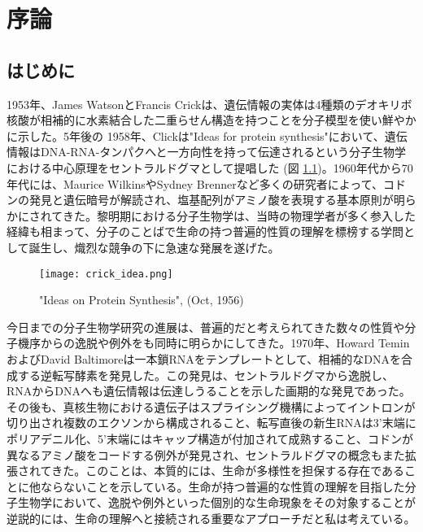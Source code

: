 \chapter{序論}

\section{はじめに}
1953年、James WatsonとFrancis Crickは、遺伝情報の実体は4種類のデオキリボ核酸が相補的に水素結合した二重らせん構造を持つことを分子模型を使い鮮やかに示した。5年後の
1958年、Clickは"Ideas for protein synthesis"において、遺伝情報はDNA-RNA-タンパクへと一方向性を持って伝達されるという分子生物学における中心原理をセントラルドグマとして提唱した (図 \ref{fig:crick_idea})。1960年代から70年代には、Maurice WilkinsやSydney Brennerなど多くの研究者によって、コドンの発見と遺伝暗号が解読され、塩基配列がアミノ酸を表現する基本原則が明らかにされてきた。黎明期における分子生物学は、当時の物理学者が多く参入した経緯も相まって、分子のことばで生命の持つ普遍的性質の理解を標榜する学問として誕生し、熾烈な競争の下に急速な発展を遂げた。
\begin{figure}[htbp]
	\begin{center}
		\texttt{[image: crick\_idea.png]}
	\end{center}
	\caption{"Ideas on Protein Synthesis", (Oct, 1956)}
	\label{fig:crick_idea}
\end{figure}
\par
今日までの分子生物学研究の進展は、普遍的だと考えられてきた数々の性質や分子機序からの逸脱や例外をも同時に明らかにしてきた。1970年、Howard TeminおよびDavid Baltimoreは一本鎖RNAをテンプレートとして、相補的なDNAを合成する逆転写酵素を発見した。この発見は、セントラルドグマから逸脱し、RNAからDNAへも遺伝情報は伝達しうることを示した画期的な発見であった。その後も、真核生物における遺伝子はスプライシング機構によってイントロンが切り出され複数のエクソンから構成されること、転写直後の新生RNAは3'末端にポリアデニル化、5'末端にはキャップ構造が付加されて成熟すること、コドンが異なるアミノ酸をコードする例外が発見され、セントラルドグマの概念もまた拡張されてきた。このことは、本質的には、生命が多様性を担保する存在であることに他ならないことを示している。生命が持つ普遍的な性質の理解を目指した分子生物学において、逸脱や例外といった個別的な生命現象をその対象することが逆説的には、生命の理解へと接続される重要なアプローチだと私は考えている。
